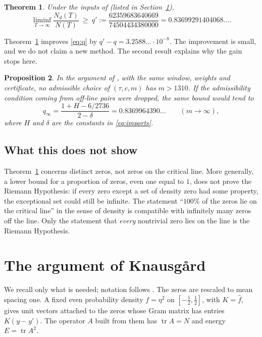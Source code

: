 \documentclass[reqno,11pt]{amsart}
\numberwithin{equation}{section}
\theoremstyle{plain}
\newtheorem{theorem}{Theorem}
\newtheorem{proposition}[theorem]{Proposition}
\theoremstyle{remark}
\DeclareMathOperator{\tr}{tr}
\begin{document}
\begin{theorem}\label{thm:main}
Under the inputs of \cite{Kna26} (listed in Section~\ref{sec:inputs}),
\[
\liminf_{T\to\infty}\frac{N_d(T)}{N(T)}\ \ge\ q':=\frac{62359683640669}{74504434380000}=0.83699291404068\ldots .
\]
\end{theorem}

Theorem~\ref{thm:main} improves \eqref{eq:q} by $q'-q=3.2588\ldots\cdot10^{-8}$.
The improvement is small, and we do not claim a new method. The second
result explains why the gain stops here.

\begin{proposition}\label{prop:limit}
In the argument of \cite{Kna26}, with the same window, weights and
certificate, no admissible choice of $(\tau,c,m)$ has $m>1310$.
If the admissibility condition coming from off-line pairs were dropped, the
same bound would tend to
\[
q_\infty=\frac{1+H-6/2736}{2-\delta}=0.8369964390\ldots\qquad(m\to\infty),
\]
where $H$ and $\delta$ are the constants in \eqref{eq:imports}.
\end{proposition}

\subsection*{What this does not show}
Theorem~\ref{thm:main} concerns distinct zeros, not zeros on the critical
line. More generally, a lower bound for a proportion of zeros, even one
equal to $1$, does not prove the Riemann Hypothesis: if every zero except a
set of density zero had some property, the exceptional set could still be
infinite. The statement ``$100\%$ of the zeros lie on the critical line'' in
the sense of density is compatible with infinitely many zeros off the line.
Only the statement that \emph{every} nontrivial zero lies on the line is the
Riemann Hypothesis.

\section{The argument of Knausg{\aa}rd}\label{sec:inputs}

We recall only what is needed; notation follows \cite{Kna26}. The zeros are
rescaled to mean spacing one. A fixed even probability density $f=\eta^2$ on
$[-\tfrac12,\tfrac12]$, with $K=\hat f$, gives unit vectors attached to the
zeros whose Gram matrix has entries $K(y-y')$. The operator $A$ built from
them has $\tr A=N$ and energy $E=\tr A^2$.
\end{document}
